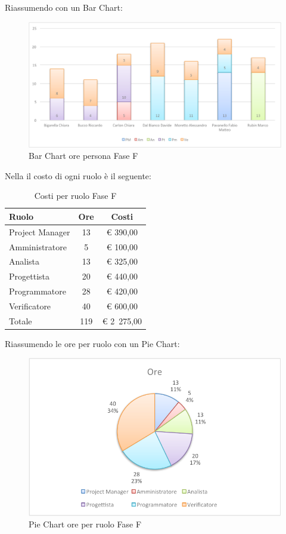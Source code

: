 				Riassumendo con un Bar Chart:
				\begin{figure}[H]\centering
					\includegraphics[width=\textwidth]{PianoDiProgetto/Pics/ChartOreFaseF.pdf}
					\caption{Bar Chart ore persona Fase F}
				\end{figure}
				Nella  il costo di ogni ruolo è il seguente:
				\begin{table}[H]
					\begin{center}
						\begin{tabular}{| l | c | c |}
							\hline
							Ruolo 			& Ore 		& Costi  \\ \hline
							
							Project Manager	& 13 		& \euro{} 390,00 	\\
							Amministratore 		& 5 		& \euro{} 100,00 	\\
							Analista	 		& 13 		& \euro{} 325,00 	\\
							Progettista 		& 20 		& \euro{} 440,00  	\\
							Programmatore		& 28 		& \euro{} 420,00 	\\
							Verificatore		& 40 		& \euro{} 600,00 	\\ \hline \hline
							
							Totale	 		& 119 	& \euro{} 2~275,00 	\\ \hline
						\end{tabular}
					\end{center}
					\caption{Costi per ruolo Fase F}
				\end{table}
				Riassumendo le ore per ruolo con un Pie Chart:
				\begin{figure}[H]\centering
					\includegraphics[width=\textwidth]{PianoDiProgetto/Pics/ChartTotOreFaseF.pdf}
					\caption{Pie Chart ore per ruolo Fase F}
				\end{figure}
